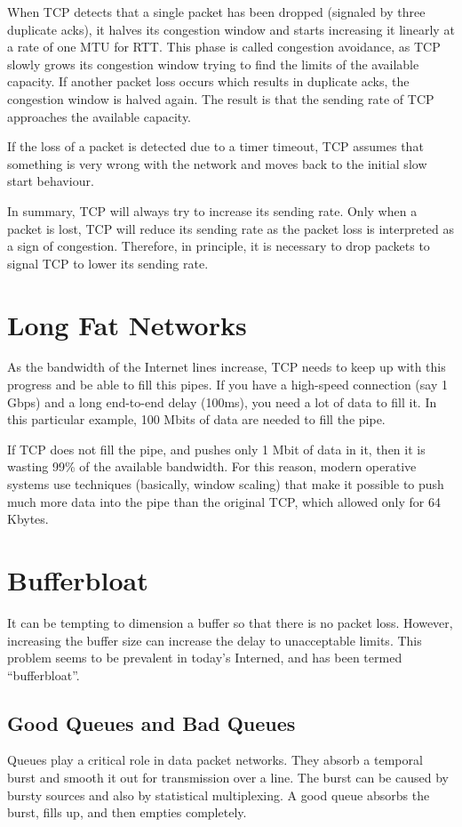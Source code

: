 When TCP detects that a single packet has been dropped (signaled by three duplicate acks), it halves its congestion window and starts increasing it linearly at a rate of one MTU for RTT.
This phase is called congestion avoidance, as TCP slowly grows its congestion window trying to find the limits of the available capacity.
If another packet loss occurs which results in duplicate acks, the congestion window is halved again.
The result is that the sending rate of TCP approaches the available capacity.

If the loss of a packet is detected due to a timer timeout, TCP assumes that something is very wrong with the network and moves back to the initial slow start behaviour.

In summary, TCP will always try to increase its sending rate.
Only when a packet is lost, TCP will reduce its sending rate as the packet loss is interpreted as a sign of congestion.
Therefore, in principle, it is necessary to drop packets to signal TCP to lower its sending rate.

\section{Long Fat Networks}

As the bandwidth of the Internet lines increase, TCP needs to keep up with this progress and be able to fill this pipes.
If you have a high-speed connection (say 1 Gbps) and a long end-to-end delay (100ms), you need a lot of data to fill it.
In this particular example, 100 Mbits of data are needed to fill the pipe.

If TCP does not fill the pipe, and pushes only 1 Mbit of data in it, then it is wasting 99\% of the available bandwidth.
For this reason, modern operative systems use techniques (basically, window scaling) that make it possible to push much more data into the pipe than the original TCP, which allowed only for 64 Kbytes.


\section{Bufferbloat}

It can be tempting to dimension a buffer so that there is no packet loss.
However, increasing the buffer size can increase the delay to unacceptable limits.
This problem seems to be prevalent in today's Interned, and has been termed ``bufferbloat''.

\subsection{Good Queues and Bad Queues}
Queues play a critical role in data packet networks.
They absorb a temporal burst and smooth it out for transmission over a line.
The burst can be caused by bursty sources and also by statistical multiplexing.
A good queue absorbs the burst, fills up, and then empties completely.

